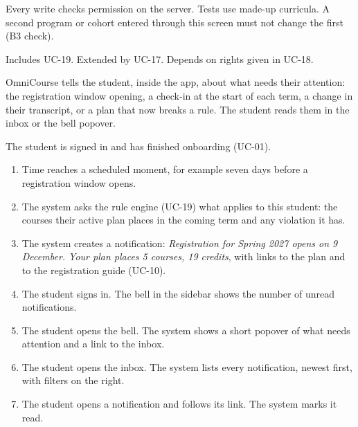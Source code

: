 Every write checks permission on the server. Tests use made-up curricula. A second program or cohort entered through this
screen must not change the first (B3 check).

Includes UC-19. Extended by UC-17. Depends on rights given in UC-18.


OmniCourse tells the student, inside the app, about what needs their attention: the registration window opening, a
check-in at the start of each term, a change in their transcript, or a plan that now breaks a rule. The student reads them
in the inbox or the bell popover.

The student is signed in and has finished onboarding (UC-01).

\begin{enumerate}
  \item Time reaches a scheduled moment, for example seven days before a registration window opens.
  \item The system asks the rule engine (UC-19) what applies to this student: the courses their active plan places in the
        coming term and any violation it has.
  \item The system creates a notification: \emph{Registration for Spring 2027 opens on 9 December. Your plan places 5
        courses, 19 credits}, with links to the plan and to the registration guide (UC-10).
  \item The student signs in. The bell in the sidebar shows the number of unread notifications.
  \item The student opens the bell. The system shows a short popover of what needs attention and a link to the inbox.
  \item The student opens the inbox. The system lists every notification, newest first, with filters on the right.
  \item The student opens a notification and follows its link. The system marks it read.
\end{enumerate}

